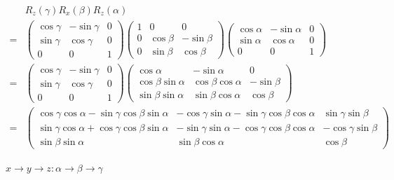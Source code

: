 \documentclass[
]{book}
\theoremstyle{definition}
\theoremstyle{definition}
\theoremstyle{definition}
\theoremstyle{definition}
\theoremstyle{remark}
\begin{document}
\[
\begin{aligned}
 & R_{{\scriptscriptstyle z}}\left(\gamma\right)R_{{\scriptscriptstyle x}}\left(\beta\right)R_{{\scriptscriptstyle z}}\left(\alpha\right)\\
= & \begin{pmatrix}\cos\gamma & -\sin\gamma & 0\\
\sin\gamma & \cos\gamma & 0\\
0 & 0 & 1
\end{pmatrix}\begin{pmatrix}1 & 0 & 0\\
0 & \cos\beta & -\sin\beta\\
0 & \sin\beta & \cos\beta
\end{pmatrix}\begin{pmatrix}\cos\alpha & -\sin\alpha & 0\\
\sin\alpha & \cos\alpha & 0\\
0 & 0 & 1
\end{pmatrix}\\
= & \begin{pmatrix}\cos\gamma & -\sin\gamma & 0\\
\sin\gamma & \cos\gamma & 0\\
0 & 0 & 1
\end{pmatrix}\begin{pmatrix}\cos\alpha & -\sin\alpha & 0\\
\cos\beta\sin\alpha & \cos\beta\cos\alpha & -\sin\beta\\
\sin\beta\sin\alpha & \sin\beta\cos\alpha & \cos\beta
\end{pmatrix}\\
= & \begin{pmatrix}\cos\gamma\cos\alpha-\sin\gamma\cos\beta\sin\alpha & -\cos\gamma\sin\alpha-\sin\gamma\cos\beta\cos\alpha & \sin\gamma\sin\beta\\
\sin\gamma\cos\alpha+\cos\gamma\cos\beta\sin\alpha & -\sin\gamma\sin\alpha-\cos\gamma\cos\beta\cos\alpha & -\cos\gamma\sin\beta\\
\sin\beta\sin\alpha & \sin\beta\cos\alpha & \cos\beta
\end{pmatrix}
\end{aligned}
\]

\(x\rightarrow y\rightarrow z:\alpha\rightarrow\beta\rightarrow\gamma\)
\end{document}
